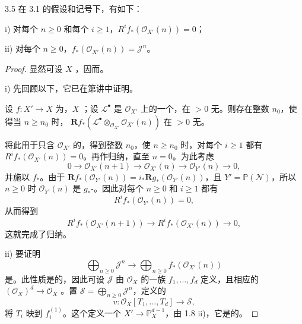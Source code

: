 \begin{SGAresult}{}{3.5}
在 3.1 的假设和记号下，有如下：

 i) 对每个 $n\geq0$ 和每个 $i\geq1$，$R^if_*(\mathcal O_{X'}(n))=0$；

 ii) 对每个 $n\geq0$，$f_*(\mathcal O_{X'}(n))=\mathcal J^n$。
\end{SGAresult}
\begin{proof}
显然可设 $X$ ，因而。

i) 先回顾以下，它已在第讲中证明。
\begin{SGAresult}{}{}
设 $f:X'\to X$ 为，$X$ ；设 $\mathcal L^\bullet$ 是 $\mathcal O_{X'}$ 上的一个，在 $>0$ 无。则存在整数 $n_0$，使得当 $n\geq n_0$ 时， $\mathbf Rf_*(\mathcal L^\bullet\otimes_{\mathcal O_{X'}}\mathcal O_{X'}(n))$ 在 $>0$ 无。
\end{SGAresult}
将此用于只含 $\mathcal O_{X'}$ 的，得到整数 $n_0$，使 $n\geq n_0$ 时，对每个 $i\geq1$ 都有 $R^if_*(\mathcal O_{X'}(n))=0$。再作归纳，直至 $n=0$。为此考虑
\[
0\longrightarrow\mathcal O_{X'}(n+1)\longrightarrow\mathcal O_{X'}(n)\longrightarrow\mathcal O_{Y'}(n)\longrightarrow0,
\]
并施以 $f_*$。由于 $\mathbf Rf_*(\mathcal O_{Y'}(n))=i_*\mathbf Rg_*(\mathcal O_{Y'}(n))$，且 $Y'=\mathbb P(\mathcal N)$，所以 $n\geq0$ 时 $\mathcal O_{Y'}(n)$ 是 $g_*$-。因此对每个 $n\geq0$ 和 $i\geq1$ 都有
\[
R^if_*(\mathcal O_{Y'}(n))=0,
\]
从而得到
\[
R^if_*(\mathcal O_{X'}(n+1))\longrightarrow R^if_*(\mathcal O_{X'}(n))\longrightarrow0,
\]
这就完成了归纳。

ii) 要证明
\[
\bigoplus_{n\geq0}\mathcal J^n\longrightarrow\bigoplus_{n\geq0}f_*(\mathcal O_{X'}(n))
\]
是。此性质是的，因此可设 $\mathcal J$ 由 $\mathcal O_X$ 的一族 $f_1,\ldots,f_d$ 定义，且相应的 $(\mathcal O_X)^d\to\mathcal O_X$ 。置 $\mathcal S=\bigoplus_{n\geq0}\mathcal J^n$，定义的
\[
v:\mathcal O_X[T_1,\ldots,T_d]\longrightarrow\mathcal S,
\]
将 $T_i$ 映到 $f_i^{(1)}$。这个定义一个 $X'\to\mathbb P_X^{d-1}$，由 1.8 ii)，它是的。


\end{proof}
